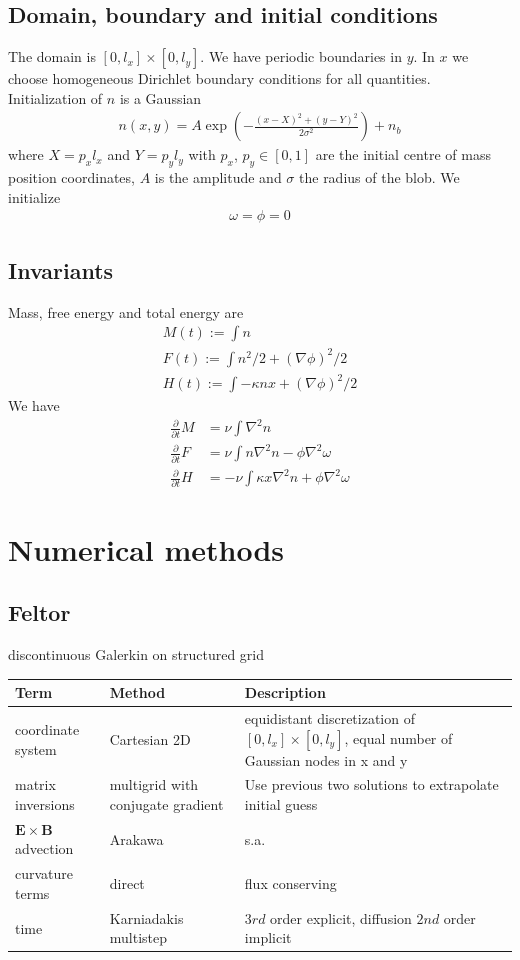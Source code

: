 \documentclass{hitec} %
\newcommand{\ExB}{$\bm{E}\times\bm{B} \,$}
\begin{document}
\subsection{Domain, boundary and initial conditions}
The domain is $[0,l_x]\times[0,l_y]$.
We have periodic boundaries in $y$. In $x$ we choose homogeneous Dirichlet boundary conditions for all quantities.
Initialization of $n$ is a Gaussian
\begin{align}
    n(x,y) = A\exp\left( -\frac{(x-X)^2 + (y-Y)^2}{2\sigma^2}\right) + n_b
    \label{}
\end{align}
where $X = p_x l_x$ and $Y=p_yl_y$ with $p_x$, $p_y\in [0,1]$ are the initial centre of mass position coordinates, $A$ is the amplitude and $\sigma$ the
radius of the blob.
We initialize
\begin{align}
    \omega = \phi = 0
    \label{}
\end{align}
\subsection{Invariants}
Mass, free energy and total energy are
\begin{align*}
    M(t) := \int n \\
    F(t) := \int n^2/2 + (\nabla\phi)^2/2 \\
    H(t) := \int -\kappa nx + (\nabla\phi)^2/2
    \label{}
\end{align*}
We have
\begin{align}
  \frac{\partial}{\partial t} M &= \nu \int \nabla^2 n \\
  \frac{\partial}{\partial t} F &= \nu\int n\nabla^2 n - \phi\nabla^2\omega \\
  \frac{\partial}{\partial t} H &= - \nu \int \kappa x \nabla^2 n + \phi\nabla^2\omega
  \label{}
\end{align}

\section{Numerical methods}
\subsection{Feltor}
discontinuous Galerkin on structured grid
\begin{longtable}{ll>{\RaggedRight}p{7cm}}
\toprule
\rowcolor{gray!50}\textbf{Term} &  \textbf{Method} & \textbf{Description}  \\ \midrule
coordinate system & Cartesian 2D & equidistant discretization of $[0,l_x] \times [0,l_y]$, equal number of Gaussian nodes in x and y \\
matrix inversions & multigrid with conjugate gradient & Use previous two solutions to extrapolate initial guess \\
\ExB advection & Arakawa & s.a. \cite{Einkemmer2013} \\
curvature terms & direct & flux conserving \\
time &  Karniadakis multistep & $3rd$ order explicit, diffusion $2nd$ order implicit \\
\bottomrule
\end{longtable}
\end{document}
